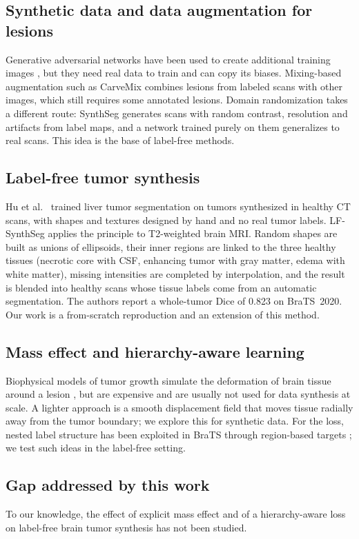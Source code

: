 \documentclass[10pt,a4paper,twocolumn,twoside]{article}
\begin{document}
\subsection{Synthetic data and data augmentation for lesions}
Generative adversarial networks have been used to create additional training
images \cite{shin}, but they need real data to train and can copy its biases.
Mixing-based augmentation such as CarveMix \cite{carvemix} combines lesions
from labeled scans with other images, which still requires some annotated
lesions. Domain randomization takes a different route: SynthSeg
\cite{synthseg} generates scans with random contrast, resolution and
artifacts from label maps, and a network trained purely on them generalizes
to real scans. This idea is the base of label-free methods.

\subsection{Label-free tumor synthesis}
Hu et al.\ \cite{labelfree_liver} trained liver tumor segmentation on tumors
synthesized in healthy CT scans, with shapes and textures designed by hand and
no real tumor labels. LF-SynthSeg \cite{lfsynthseg} applies the principle to
T2-weighted brain MRI. Random shapes are built as unions of ellipsoids, their
inner regions are linked to the three healthy tissues (necrotic core with CSF,
enhancing tumor with gray matter, edema with white matter), missing
intensities are completed by interpolation, and the result is blended into
healthy scans whose tissue labels come from an automatic segmentation. The
authors report a whole-tumor Dice of 0.823 on BraTS~2020. Our work is a
from-scratch reproduction and an extension of this method.

\subsection{Mass effect and hierarchy-aware learning}
Biophysical models of tumor growth simulate the deformation of brain tissue
around a lesion \cite{hogea}, but are expensive and are usually not used for
data synthesis at scale. A lighter approach is a smooth displacement field
that moves tissue radially away from the tumor boundary; we explore this
for synthetic data. For the loss, nested label structure has been exploited in
BraTS through region-based targets \cite{nnunet,myronenko}; we test such
ideas in the label-free setting.

\subsection{Gap addressed by this work}
To our knowledge, the effect of explicit mass effect and of a hierarchy-aware
loss on label-free brain tumor synthesis has not been studied.
\end{document}
